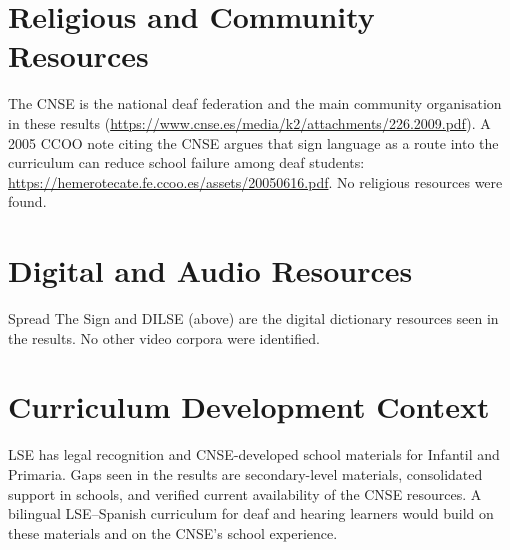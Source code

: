 \documentclass[12pt]{article}
\begin{document}
\section{Religious and Community Resources}
The CNSE is the national deaf federation and the main community organisation in these results (\url{https://www.cnse.es/media/k2/attachments/226.2009.pdf}). A 2005 CCOO note citing the CNSE argues that sign language as a route into the curriculum can reduce school failure among deaf students: \url{https://hemerotecate.fe.ccoo.es/assets/20050616.pdf}. No religious resources were found.

\section{Digital and Audio Resources}
Spread The Sign and DILSE (above) are the digital dictionary resources seen in the results. No other video corpora were identified.

\section{Curriculum Development Context}
LSE has legal recognition and CNSE-developed school materials for Infantil and Primaria. Gaps seen in the results are secondary-level materials, consolidated support in schools, and verified current availability of the CNSE resources. A bilingual LSE--Spanish curriculum for deaf and hearing learners would build on these materials and on the CNSE's school experience.
\end{document}
